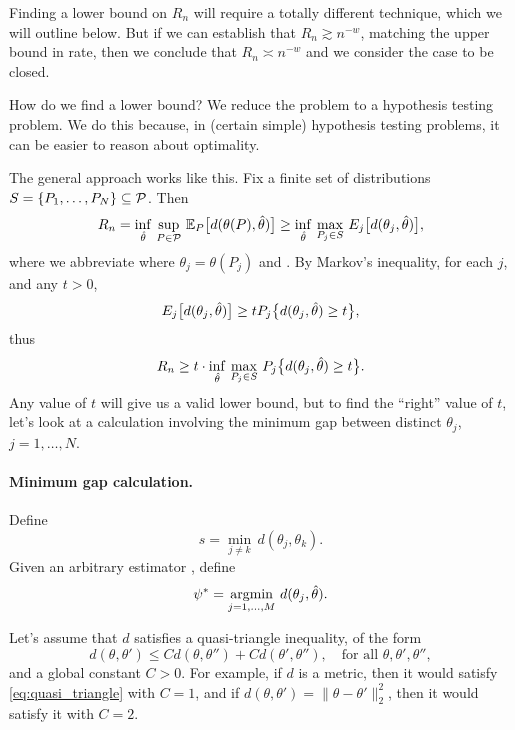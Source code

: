 \documentclass{article}
\begin{document}
Finding a lower bound on $R_n$ will require a totally different technique, which
we will outline below. But if we can establish that $R_n \gtrsim n^{-w}$,
matching the upper bound in rate, then we conclude that $R_n \asymp n^{-w}$ and
we consider the case to be closed.

How do we find a lower bound? We reduce the problem to a hypothesis testing
problem. We do this because, in (certain simple) hypothesis testing problems,
it can be easier to reason about optimality.

The general approach works like this. Fix a finite set of distributions $S =
\{P_1,\dots,P_N\} \subseteq \mathcal{P}$. Then 
\[
R_n = \inf_{\hat{\theta}} \, \sup_{P \in \mathcal{P}} \, \mathbb{E}_P \big[ d(\theta(P), \hat{\theta})
\big] \geq \inf_{\hat{\theta}} \, \max_{P_j \in S} \, E_j \big[ d(\theta_j, \hat{\theta})
\big],  
\]
where we abbreviate where $\theta_j = \theta(P_j)$ and . By Markov's inequality, for each $j$, and any $t>0$, 
\[
E_j \big[ d(\theta_j, \hat{\theta}) \big] \geq t P_j \big\{ d(\theta_j, \hat{\theta}) 
\geq t \big\}, 
\]
thus
\begin{equation}
\label{eq:finite_lb}
R_n \geq t \cdot \inf_{\hat{\theta}} \, \max_{P_j \in S} \, P_j \big\{ d(\theta_j,
\hat{\theta}) \geq t \big\}. 
\end{equation}
Any value of $t$ will give us a valid lower bound, but to find the ``right''
value of $t$, let's look at a calculation involving the minimum gap between
distinct $\theta_j$, $j=1,\dots,N$.

\paragraph{Minimum gap calculation.}

Define
\begin{equation}
\label{eq:min_gap}
s = \min_{j \not= k} \, d(\theta_j, \theta_k).
\end{equation}
Given an arbitrary estimator \smash{$\htheta$}, define 
\begin{equation}
\label{eq:psi_star}
\psi^* = \mathop{\mathrm{argmin}}_{j=1,\dots,M} \, d(\theta_j, \hat{\theta}).
\end{equation}

Let's assume that $d$ satisfies a quasi-triangle inequality, of the form 
\begin{equation}
\label{eq:quasi_triangle}
d(\theta, \theta') \leq C d(\theta,\theta'') + C d(\theta',\theta''), \quad
\text{for all $\theta,\theta',\theta''$},
\end{equation}
and a global constant $C>0$. For example, if $d$ is a metric, then it would 
satisfy \eqref{eq:quasi_triangle} with $C=1$, and if $d(\theta, \theta') =
\|\theta - \theta'\|_2^2$, then it would satisfy it with $C=2$. 
\end{document}
